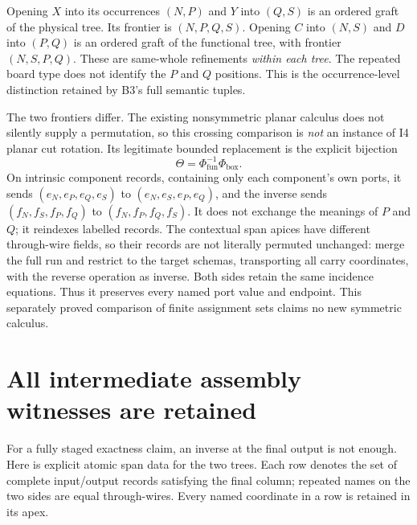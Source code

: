 \documentclass[11pt]{article}
\begin{document}
Opening $X$ into its occurrences $(N,P)$ and $Y$ into $(Q,S)$ is an ordered
graft of the physical tree. Its frontier is $(N,P,Q,S)$. Opening $C$ into
$(N,S)$ and $D$ into $(P,Q)$ is an ordered graft of the functional tree, with
frontier $(N,S,P,Q)$. These are same-whole refinements \emph{within each tree}.
The repeated board type does not identify the $P$ and $Q$ positions. This is
the occurrence-level distinction retained by B3's full semantic tuples.

The two frontiers differ. The existing nonsymmetric planar calculus does not
silently supply a permutation, so this crossing comparison is \emph{not} an
instance of I4 planar cut rotation. Its legitimate bounded replacement is the
explicit bijection
\begin{equation}\label{eq:cross}
 \Theta=\Phi_{\mathrm{fun}}^{-1}\Phi_{\mathrm{box}}.
\end{equation}
On intrinsic component records, containing only each component's own ports,
it sends $(e_N,e_P,e_Q,e_S)$ to
$(e_N,e_S,e_P,e_Q)$, and the inverse sends $(f_N,f_S,f_P,f_Q)$ to
$(f_N,f_P,f_Q,f_S)$. It does not exchange the meanings of $P$ and $Q$; it
reindexes labelled records. The contextual span apices have different
through-wire fields, so their records are not literally permuted unchanged:
merge the full run and restrict to the target schemas, transporting all carry
coordinates, with the reverse operation as inverse.
Both sides retain the same incidence equations.
Thus it preserves every named port value and endpoint. This separately proved
comparison of finite assignment sets claims no new symmetric calculus.

\section{All intermediate assembly witnesses are retained}

For a fully staged exactness claim, an inverse at the final output is not
enough. Here is explicit atomic span data for the two trees. Each row denotes
the set of complete input/output records satisfying the final column; repeated
names on the two sides are equal through-wires. Every named coordinate in a
row is retained in its apex.
\end{document}
